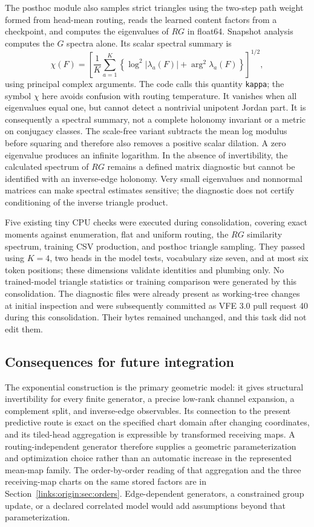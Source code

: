 \documentclass[11pt]{article}
\theoremstyle{definition}
\theoremstyle{remark}
\providecommand{\cfg}[1]{{\small\texttt{#1}}}
\begin{document}
The posthoc module also samples strict triangles using the two-step path weight formed from head-mean routing, reads the learned content factors from a checkpoint, and computes the eigenvalues of $RG$ in float64. Snapshot analysis computes the $G$ spectra alone. Its scalar spectral summary is
\begin{equation}
\chi(F)=\left[\frac1K\sum_{a=1}^K
\left\{\log^2|\lambda_a(F)|+\arg^2\lambda_a(F)\right\}\right]^{1/2},
\label{links:eq:spectral_summary}
\end{equation}
using principal complex arguments. The code calls this quantity \cfg{kappa}; the symbol $\chi$ here avoids confusion with routing temperature. It vanishes when all eigenvalues equal one, but cannot detect a nontrivial unipotent Jordan part. It is consequently a spectral summary, not a complete holonomy invariant or a metric on conjugacy classes. The scale-free variant subtracts the mean log modulus before squaring and therefore also removes a positive scalar dilation. A zero eigenvalue produces an infinite logarithm. In the absence of invertibility, the calculated spectrum of $RG$ remains a defined matrix diagnostic but cannot be identified with an inverse-edge holonomy. Very small eigenvalues and nonnormal matrices can make spectral estimates sensitive; the diagnostic does not certify conditioning of the inverse triangle product.

Five existing tiny CPU checks were executed during consolidation, covering exact moments against enumeration, flat and uniform routing, the $RG$ similarity spectrum, training CSV production, and posthoc triangle sampling. They passed using $K=4$, two heads in the model tests, vocabulary size seven, and at most six token positions; these dimensions validate identities and plumbing only. No trained-model triangle statistics or training comparison were generated by this consolidation. The diagnostic files were already present as working-tree changes at initial inspection and were subsequently committed as VFE 3.0 pull request 40 during this consolidation. Their bytes remained unchanged, and this task did not edit them.

\subsection{Consequences for future integration}
\label{links:sec:integration}

The exponential construction is the primary geometric model: it gives structural invertibility for every finite generator, a precise low-rank channel expansion, a complement split, and inverse-edge observables. Its connection to the present predictive route is exact on the specified chart domain after changing coordinates, and its tiled-head aggregation is expressible by transformed receiving maps. A routing-independent generator therefore supplies a geometric parameterization and optimization choice rather than an automatic increase in the represented mean-map family. The order-by-order reading of that aggregation and the three receiving-map charts on the same stored factors are in Section~\ref{links:origin:sec:orders}. Edge-dependent generators, a constrained group update, or a declared correlated model would add assumptions beyond that parameterization.
\end{document}
